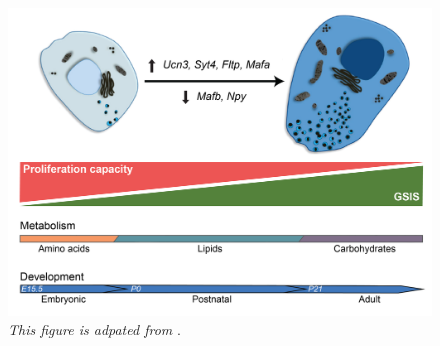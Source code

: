 \begin{figure}[t]
    \centering
    \includegraphics[width=12cm]{Chapter1/Fig/F1-16-01.png}
    \caption[]{\textit{This figure is adpated from }\textbf{\cite{salinno_-cell_2019}}.}
    \label{fig:chp1_betamat}
\end{figure}




